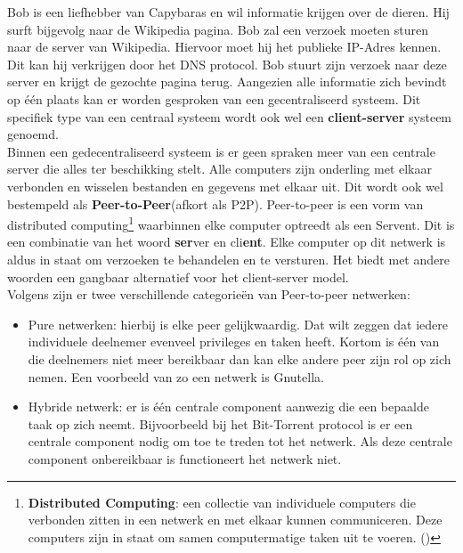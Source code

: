 Bob is een liefhebber van Capybaras en wil informatie krijgen over de dieren. Hij surft bijgevolg naar de Wikipedia pagina. Bob zal een verzoek moeten sturen naar de server van Wikipedia. Hiervoor moet hij het publieke IP-Adres kennen. Dit kan hij verkrijgen door het DNS protocol. Bob stuurt zijn verzoek naar deze server en krijgt de gezochte pagina terug. Aangezien alle informatie zich bevindt op één plaats kan er worden gesproken van een gecentraliseerd systeem. Dit specifiek type van een centraal systeem wordt ook wel een \textbf{client-server} systeem genoemd.\\

Binnen een gedecentraliseerd systeem is er geen spraken meer van een centrale server die alles ter beschikking stelt. Alle computers zijn onderling met elkaar verbonden en wisselen bestanden en gegevens met elkaar uit. Dit wordt ook wel bestempeld als \textbf{Peer-to-Peer}(afkort als P2P). Peer-to-peer is een vorm van distributed computing\footnote{\textbf{Distributed Computing}: een collectie van individuele computers die verbonden zitten in een netwerk en met elkaar kunnen communiceren. Deze computers zijn in staat om samen computermatige taken uit te voeren. (\autocite{Attiya2004})} waarbinnen elke computer optreedt als een Servent. Dit is een combinatie van het woord \textbf{ser}ver en cli\textbf{ent}. Elke computer op dit netwerk is aldus in staat om verzoeken te behandelen en te versturen. Het biedt met andere woorden een gangbaar alternatief voor het client-server model. \\
 
Volgens \textcite{Schollmeier2001} zijn er  twee verschillende categorieën van Peer-to-peer netwerken:

\begin{itemize}
\item Pure netwerken: hierbij is elke peer gelijkwaardig. Dat wilt zeggen dat iedere individuele deelnemer evenveel privileges en taken heeft. Kortom is één van die deelnemers niet meer bereikbaar dan kan elke andere peer zijn rol op zich nemen. Een voorbeeld van zo een netwerk is Gnutella.\\
\item Hybride netwerk: er is één centrale component aanwezig die een bepaalde taak op zich neemt. Bijvoorbeeld bij het Bit-Torrent protocol is er een centrale component nodig om toe te treden tot het netwerk. Als deze centrale component onbereikbaar is functioneert het netwerk niet.\\
\end{itemize}


